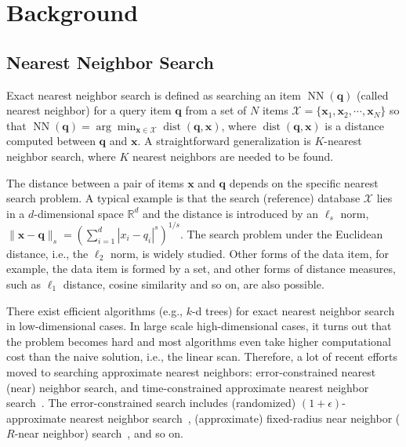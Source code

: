 \documentclass[10pt,journal,compsoc]{IEEEtran}
\begin{document}
\section{Background}
\label{sec:overview}
\subsection{Nearest Neighbor Search}
Exact nearest neighbor search is defined as
searching an item $\operatorname{NN}(\mathbf{q})$
(called nearest neighbor)
for a query item $\mathbf{q}$
from a set of $N$ items $\mathcal{X} = \{\mathbf{x}_1, \mathbf{x}_2, \cdots, \mathbf{x}_N\}$
so that
$\operatorname{NN}(\mathbf{q}) = \arg\min_{\mathbf{x} \in \mathcal{X}} \operatorname{dist}(\mathbf{q}, \mathbf{x})$,
where $\operatorname{dist}(\mathbf{q}, \mathbf{x})$ is a distance
computed between $\mathbf{q}$ and $\mathbf{x}$.
A straightforward generalization
is $K$-nearest neighbor search,
where $K$ nearest neighbors are needed to be found.%


The distance
between a pair of items $\mathbf{x}$ and $\mathbf{q}$
depends on the specific nearest search problem.
A typical example is
that
the search (reference) database $\mathcal{X}$ lies in
a $d$-dimensional space $\mathbb{R}^d$
and the distance is introduced by an $\ell_s$ norm,
$\|\mathbf{x} - \mathbf{q}\|_s = (\sum_{i=1}^d |x_i - q_i|^s)^{1/s}$.
The search problem under the Euclidean distance, i.e., the $\ell_2$ norm,
is widely studied.
Other forms of the data item,
for example, the data item is formed by a set,
and other forms of distance measures,
such as $\ell_1$ distance,
cosine similarity and so on,
are also possible.


There exist efficient algorithms (e.g., $k$-d trees)
for exact nearest neighbor search
in low-dimensional cases.
In large scale high-dimensional cases,
it turns out that the problem becomes hard
and most algorithms even take higher computational cost
than the naive solution, i.e., the linear scan.
Therefore,
a lot of recent efforts moved
to searching approximate nearest neighbors:
error-constrained nearest (near) neighbor search,
and
time-constrained approximate nearest neighbor search~\cite{MujaL09, MujaL14}.
The error-constrained search includes
(randomized) $(1+\epsilon)$-approximate nearest neighbor search~\cite{IndykM98, Charikar02, AndoniI06},
(approximate) fixed-radius near neighbor ($R$-near neighbor) search~\cite{BentleySW77},
and so on.
\end{document}
